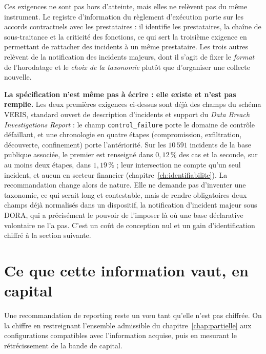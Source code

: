 Ces exigences ne sont pas hors d'atteinte, mais elles ne relèvent pas du même instrument. Le
registre d'information du règlement d'exécution \citep{eu2024_2956} porte sur les accords
contractuels avec les prestataires : il identifie les prestataires, la chaîne de sous-traitance et
la criticité des fonctions, ce qui sert la troisième exigence en permettant de rattacher des
incidents à un même prestataire. Les trois autres relèvent de la notification des incidents
majeurs, dont il s'agit de fixer le \emph{format} de l'horodatage et le \emph{choix de la
taxonomie} plutôt que d'organiser une collecte nouvelle.

\begin{cle}
\textbf{La spécification n'est même pas à écrire : elle existe et n'est pas remplie.} Les deux
premières exigences ci-dessus sont déjà des champs du schéma VERIS, standard ouvert de
description d'incidents et support du \emph{Data Breach Investigations Report} : le champ
\texttt{control\_failure} porte le domaine de contrôle défaillant, et une chronologie en quatre
étapes (compromission, exfiltration, découverte, confinement) porte l'antériorité. Sur les
$10\,591$ incidents de la base publique associée, le premier est renseigné dans $0{,}12\,\%$ des
cas et la seconde, sur au moins deux étapes, dans $1{,}19\,\%$ ; leur intersection ne
compte qu'un seul incident, et aucun en secteur financier
(chapitre~\ref{ch:identifiabilite}). La recommandation change alors de nature. Elle ne demande
pas d'inventer une taxonomie, ce qui serait long et contestable, mais de rendre
obligatoires deux champs déjà normalisés dans un dispositif, la notification
d'incident majeur sous DORA, qui a précisément le pouvoir de l'imposer là où une base
déclarative volontaire ne l'a pas. C'est un coût de conception nul et un gain d'identification
chiffré à la section suivante.
\end{cle}




\section{Ce que cette information vaut, en capital}

Une recommandation de reporting reste un v\oe u tant qu'elle n'est pas chiffrée. On la chiffre en
restreignant l'ensemble admissible du chapitre~\ref{chap:partielle} aux configurations compatibles
avec l'information acquise, puis en mesurant le rétrécissement de la bande de capital.


